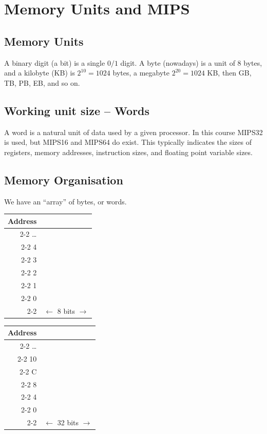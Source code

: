 \documentclass[a4paper, 11pt]{article}
\theoremstyle{definition}
\begin{document}
\section{Memory Units and MIPS}

\subsection{Memory Units}
A binary digit (a bit) is a single $0/1$ digit. A byte (nowadays) is a unit of $8$ bytes, and a kilobyte (KB) is
$2^{10}=1024$ bytes, a megabyte $2^{20}=1024$ KB, then GB, TB, PB, EB, and so on.

\subsection{Working unit size -- Words}
A word is a natural unit of data used by a given processor. In this course MIPS32 is used, but MIPS16 and MIPS64 do exist.
This typically indicates the sizes of registers, memory addresses, instruction sizes, and floating point variable sizes.

\subsection{Memory Organisation}
We have an ``array'' of bytes, or words.
\begin{center}
\begin{tabular}{r|p{2.5cm}|}
    Address & \multicolumn{1}{c}{} \\ \cline{2-2}
    \ldots  & \\ \cline{2-2}
    4       & \\ \cline{2-2}
    3       & \\ \cline{2-2}
    2       & \\ \cline{2-2}
    1       & \\ \cline{2-2}
    0       & \\ \cline{2-2}
            & \multicolumn{1}{c}{$\longleftarrow$ 8 bits $\longrightarrow$}
\end{tabular}
\qquad\qquad
\begin{tabular}{r|p{5cm}|}
    Address & \multicolumn{1}{c}{} \\ \cline{2-2}
    \ldots  & \\ \cline{2-2}
    10      & \\ \cline{2-2}
    C       & \\ \cline{2-2}
    8       & \\ \cline{2-2}
    4       & \\ \cline{2-2}
    0       & \\ \cline{2-2}
            & \multicolumn{1}{c}{$\longleftarrow$ \hfill 32 bits \hfill $\longrightarrow$}
\end{tabular}
\end{center}
\end{document}
